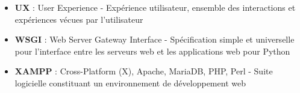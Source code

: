 \begin{itemize}
  \item \textbf{UX} : User Experience - Expérience utilisateur, ensemble des interactions et expériences vécues par l'utilisateur
  
  \item \textbf{WSGI} : Web Server Gateway Interface - Spécification simple et universelle pour l'interface entre les serveurs web et les applications web pour Python
  
  \item \textbf{XAMPP} : Cross-Platform (X), Apache, MariaDB, PHP, Perl - Suite logicielle constituant un environnement de développement web
\end{itemize}
